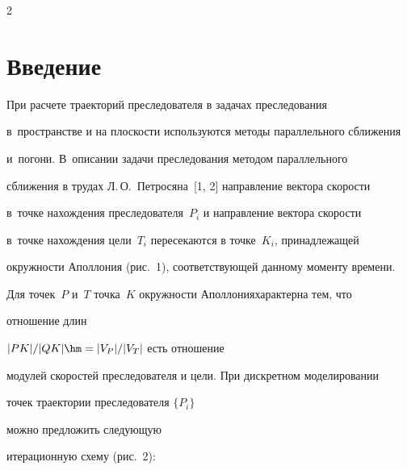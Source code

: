 \begin{multicols}{2}





\label{st\stat}


    


\section{Введение}





   При расчете траекторий преследователя в задачах преследования 


в~пространстве и на плос\-кости используются методы параллельного сбли\-же\-ния 


и~погони. В~описании задачи \mbox{преследования} методом параллельного 


сближения в трудах Л.\,О.~Пет\-ро\-ся\-на~[1, 2] на\-прав\-ле\-ние вектора ско\-рости 


в~точке на\-хож\-де\-ния преследователя~$P_i$ и на\-прав\-ле\-ние вектора ско\-рости 


в~точке на\-хож\-де\-ния цели~$T_i$ пересекаются в точке~$K_i$, принадлежащей 


окружности Аполлония (рис.~1), соответствующей данному моменту времени.





Для точек~$P$ и~$T$ точка~$K$ окружности Аполлония\linebreak характерна тем, что 


отношение длин


  $\vert PK\vert/\vert QK\vert \hm= \vert V_P\vert/\vert V_T\vert$ есть отношение 


модулей скоростей преследователя и цели. При дискретном моделировании 


точек траектории преследователя $\{P_i\}$


\mbox{можно} предложить сле\-ду\-ющую 


итерационную схему (рис.~2):











\end{multicols}


   


